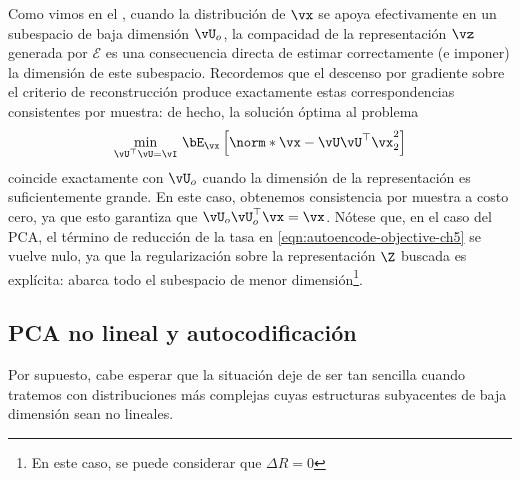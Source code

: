 \documentclass[../../book-main_es.tex]{subfiles}
\begin{document}
Como vimos en el , cuando la distribución de $\vx$ se
apoya efectivamente en un subespacio de baja dimensión $\vU_o$, la compacidad de
la representación
$\vz$ generada por $\mathcal{E}$ es una consecuencia directa de estimar
correctamente (e imponer) la dimensión de este subespacio.
Recordemos que el descenso por gradiente sobre el criterio de reconstrucción produce exactamente
estas correspondencias consistentes por muestra: de hecho, la solución óptima
al problema
\begin{equation}\label{eq:pca-reconstruction-ch5}
    \min_{\vU^\top \vU = \vI}\, \bE_{\vx}\left[\norm*{\vx
    - \vU\vU^\top \vx}_2^2\right]
\end{equation}
coincide exactamente con $\vU_o$ cuando la dimensión de la representación es
suficientemente grande. En este caso, obtenemos consistencia por muestra
a costo cero, ya que esto garantiza que $\vU_o\vU_o^\top \vx = \vx$.
Nótese que, en el caso del PCA, el término de reducción de la tasa en
\eqref{eqn:autoencode-objective-ch5} se vuelve nulo, ya que la regularización
sobre la representación $\Z$ buscada es explícita: abarca todo el
subespacio de menor dimensión\footnote{En este caso, se puede considerar que $\Delta R = 0$}.

\subsection{PCA no lineal y 
autocodificación}\label{sub:nonlinear-pca}\label{sec:NLPCA}
Por supuesto, cabe esperar que la situación deje de ser tan sencilla
cuando tratemos con distribuciones más complejas cuyas estructuras subyacentes
de baja dimensión sean no lineales.
\end{document}
